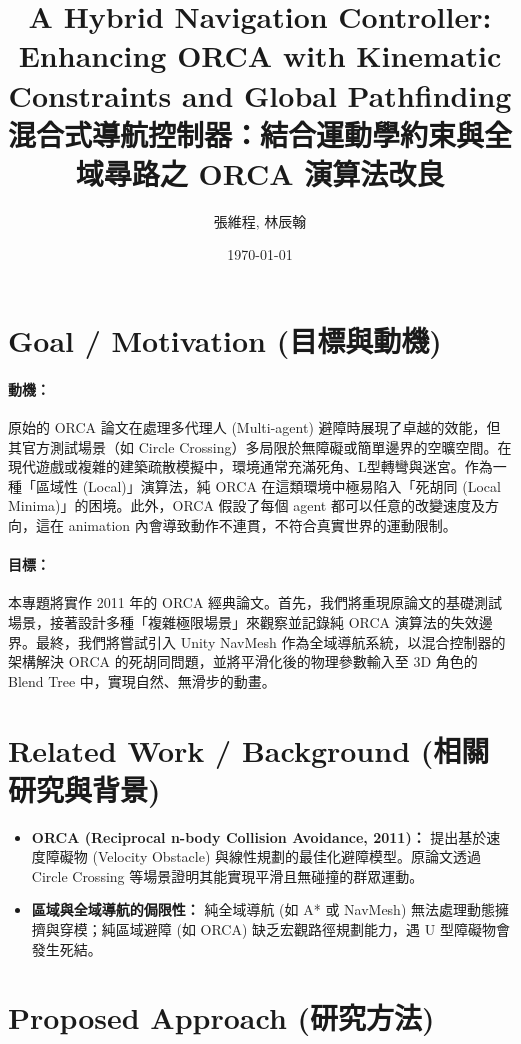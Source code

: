 \documentclass[11pt, a4paper]{article}
\title{
    \textbf{A Hybrid Navigation Controller: Enhancing ORCA with Kinematic Constraints and Global Pathfinding} \\
    \large 混合式導航控制器：結合運動學約束與全域尋路之 ORCA 演算法改良
}
\author{張維程, 林辰翰}
\date{\today}
\begin{document}
\maketitle

\section{Goal / Motivation (目標與動機)}
\paragraph{動機：}
原始的 ORCA 論文在處理多代理人 (Multi-agent) 避障時展現了卓越的效能，但其官方測試場景（如 Circle Crossing）多局限於無障礙或簡單邊界的空曠空間。在現代遊戲或複雜的建築疏散模擬中，環境通常充滿死角、L型轉彎與迷宮。作為一種「區域性 (Local)」演算法，純 ORCA 在這類環境中極易陷入「死胡同 (Local Minima)」的困境。此外，ORCA 假設了每個 agent 都可以任意的改變速度及方向，這在 animation 內會導致動作不連貫，不符合真實世界的運動限制。

\paragraph{目標：}
本專題將實作 2011 年的 ORCA 經典論文。首先，我們將重現原論文的基礎測試場景，接著設計多種「複雜極限場景」來觀察並記錄純 ORCA 演算法的失效邊界。最終，我們將嘗試引入 Unity NavMesh 作為全域導航系統，以混合控制器的架構解決 ORCA 的死胡同問題，並將平滑化後的物理參數輸入至 3D 角色的 Blend Tree 中，實現自然、無滑步的動畫。

\section{Related Work / Background (相關研究與背景)}
\begin{itemize}[leftmargin=*, labelsep=1em]
    \item \textbf{ORCA (Reciprocal n-body Collision Avoidance, 2011)：} 提出基於速度障礙物 (Velocity Obstacle) 與線性規劃的最佳化避障模型。原論文透過 Circle Crossing 等場景證明其能實現平滑且無碰撞的群眾運動。
    \item \textbf{區域與全域導航的侷限性：} 純全域導航 (如 A* 或 NavMesh) 無法處理動態擁擠與穿模；純區域避障 (如 ORCA) 缺乏宏觀路徑規劃能力，遇 U 型障礙物會發生死結。
\end{itemize}

\section{Proposed Approach (研究方法)}
\end{document}
